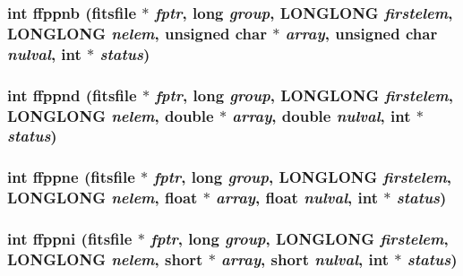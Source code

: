 \subsubsection{\setlength{\rightskip}{0pt plus 5cm}int ffppnb (\bf{fitsfile} $\ast$ {\em fptr}, long {\em group}, \bf{LONGLONG} {\em firstelem}, \bf{LONGLONG} {\em nelem}, unsigned char $\ast$ {\em array}, unsigned char {\em nulval}, int $\ast$ {\em status})}\label{test_2roimasker_2fitsio_8h_38152248c04b8b4ff9f813cd636013a4}


\subsubsection{\setlength{\rightskip}{0pt plus 5cm}int ffppnd (\bf{fitsfile} $\ast$ {\em fptr}, long {\em group}, \bf{LONGLONG} {\em firstelem}, \bf{LONGLONG} {\em nelem}, double $\ast$ {\em array}, double {\em nulval}, int $\ast$ {\em status})}\label{test_2roimasker_2fitsio_8h_dbce44e4863160818dafc8a7e74df364}


\subsubsection{\setlength{\rightskip}{0pt plus 5cm}int ffppne (\bf{fitsfile} $\ast$ {\em fptr}, long {\em group}, \bf{LONGLONG} {\em firstelem}, \bf{LONGLONG} {\em nelem}, float $\ast$ {\em array}, float {\em nulval}, int $\ast$ {\em status})}\label{test_2roimasker_2fitsio_8h_01aa3f24254f8d3895463d830679fc52}


\subsubsection{\setlength{\rightskip}{0pt plus 5cm}int ffppni (\bf{fitsfile} $\ast$ {\em fptr}, long {\em group}, \bf{LONGLONG} {\em firstelem}, \bf{LONGLONG} {\em nelem}, short $\ast$ {\em array}, short {\em nulval}, int $\ast$ {\em status})}\label{test_2roimasker_2fitsio_8h_784592ce7e18c4280a1956b6f39cc70f}



